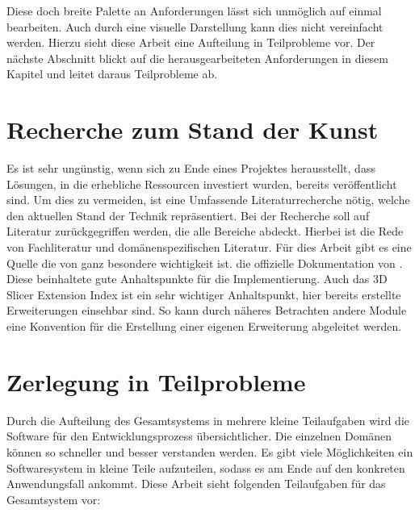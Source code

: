 Diese doch breite Palette an Anforderungen lässt sich unmöglich auf einmal
bearbeiten. Auch durch eine visuelle Darstellung kann dies nicht vereinfacht werden.
Hierzu sieht diese Arbeit eine Aufteilung in Teilprobleme vor. Der nächste Abschnitt
blickt auf die herausgearbeiteten Anforderungen in diesem Kapitel und leitet daraus
Teilprobleme ab.

\section{Recherche zum Stand der Kunst}
Es ist sehr ungünstig, wenn sich zu Ende eines Projektes herausstellt, dass Lösungen,
in die erhebliche Ressourcen investiert wurden, bereits veröffentlicht sind. Um
dies zu vermeiden, ist eine Umfassende Literaturrecherche nötig, welche den
aktuellen Stand der Technik repräsentiert. Bei der Recherche soll auf Literatur zurückgegriffen
werden, die alle Bereiche abdeckt. Hierbei ist die Rede von Fachliteratur und domänenspezifischen
Literatur. Für dies Arbeit gibt es eine Quelle die von ganz besondere
wichtigkeit ist. die offizielle Dokumentation von \citet{slicer2024}. Diese beinhaltete
gute Anhaltspunkte für die Implementierung. Auch das 3D Slicer Extension Index
ist ein sehr wichtiger Anhaltspunkt, hier bereits erstellte Erweiterungen einsehbar
sind. So kann durch näheres Betrachten andere Module eine Konvention für die
Erstellung einer eigenen Erweiterung abgeleitet werden.

\section{Zerlegung in Teilprobleme}
\label{sec_zerlegung_in_teilprobleme} Durch die Aufteilung des Gesamtsystems in
mehrere kleine Teilaufgaben wird die Software für den Entwicklungsprozess
übersichtlicher. Die einzelnen Domänen können so schneller und besser verstanden
werden. Es gibt viele Möglichkeiten ein Softwaresystem in kleine Teile
aufzuteilen, sodass es am Ende auf den konkreten Anwendungsfall ankommt. Diese
Arbeit sieht folgenden Teilaufgaben für das Gesamtsystem vor:

